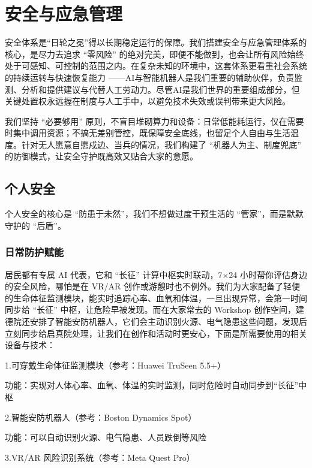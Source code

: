 \chapter{安全与应急管理}\label{ux5b89ux5168ux4e0eux5e94ux6025ux7ba1ux7406}

安全体系是``日轮之冕''得以长期稳定运行的保障。我们搭建安全与应急管理体系的核心，是尽力去追求 ``零风险'' 的绝对完美，即便不能做到，也会让所有风险始终处于可感知、可控制的范围之内。在复杂未知的环境中，这套体系更看重社会系统的持续运转与快速恢复能力 ------AI与智能机器人是我们重要的辅助伙伴，负责监测、分析和提供建议与代替人工劳动力。尽管AI是我们世界的重要组成部分，但关键处置权永远握在制度与人工手中，以避免技术失效或误判带来更大风险。

我们坚持 ``必要够用'' 原则，不盲目堆砌算力和设备：日常低能耗运行，仅在需要时集中调用资源；不搞无差别管控，既保障安全底线，也留足个人自由与生活温度。针对无人愿意自愿戍边、当兵的情况，我们构建了 ``机器人为主、制度兜底'' 的防御模式，让安全守护既高效又贴合大家的意愿。

\section{个人安全}\label{ux4e2aux4ebaux5b89ux5168}

个人安全的核心是 ``防患于未然''，我们不想做过度干预生活的 ``管家''，而是默默守护的 ``后盾''。

\subsection{日常防护赋能}\label{ux65e5ux5e38ux9632ux62a4ux8d4bux80fd}

居民都有专属 AI 代表，它和 ``长征'' 计算中枢实时联动，7×24 小时帮你评估身边的安全风险，哪怕是在 VR/AR 创作或游憩时也不例外。我们为大家配备了轻便的生命体征监测模块，能实时追踪心率、血氧和体温，一旦出现异常，会第一时间同步给 ``长征'' 中枢，让危险早被发现。而在大家常去的 Workshop 创作空间，建德院还安排了智能安防机器人，它们会主动识别火源、电气隐患这些问题，发现后立刻同步给启真院处理，让我们在创作和活动时更安心，下面是所需要使用的相关设备与技术：

1.可穿戴生命体征监测模块（参考：Huawei TruSeen 5.5+）

功能：实现对人体心率、血氧、体温的实时监测，同时危险时自动同步到``长征''中枢

2.智能安防机器人（参考：Boston Dynamics Spot）

功能：可以自动识别火源、电气隐患、人员跌倒等风险

3.VR/AR 风险识别系统（参考：Meta Quest Pro）

